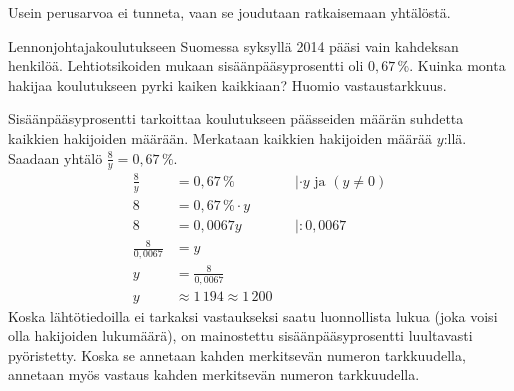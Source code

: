 Usein perusarvoa ei tunneta, vaan se joudutaan ratkaisemaan yhtälöstä.


\begin{esimerkki}
Lennonjohtajakoulutukseen Suomessa syksyllä 2014 pääsi vain kahdeksan henkilöä. Lehtiotsikoiden mukaan sisäänpääsyprosentti oli $0,67\,\%$. Kuinka monta hakijaa koulutukseen pyrki kaiken kaikkiaan? Huomio vastaustarkkuus. %
	\begin{esimratk}
	Sisäänpääsyprosentti tarkoittaa koulutukseen päässeiden määrän suhdetta kaikkien hakijoiden määrään. Merkataan kaikkien hakijoiden määrää $y$:llä. Saadaan yhtälö $\frac{8}{y}=0,67\,\%$.
	\begin{align*}
	\frac{8}{y}&=0,67\,\% &&|\cdot y\text{ ja } (y\neq 0) \\
	8&=0,67\,\%\cdot y && \\
	8&= 0,0067y && |:0,0067 \\
	\frac{8}{0,0067}&=y && \\
	y&=\frac{8}{0,0067} && \\
	y&\approx 1\,194 \approx 1\,200
	\end{align*}
	Koska lähtötiedoilla ei tarkaksi vastaukseksi saatu luonnollista lukua (joka voisi olla hakijoiden lukumäärä), on mainostettu sisäänpääsyprosentti luultavasti pyöristetty. Koska se annetaan kahden merkitsevän numeron tarkkuudella, annetaan myös vastaus kahden merkitsevän numeron tarkkuudella. %
	\end{esimratk}
\end{esimerkki}

